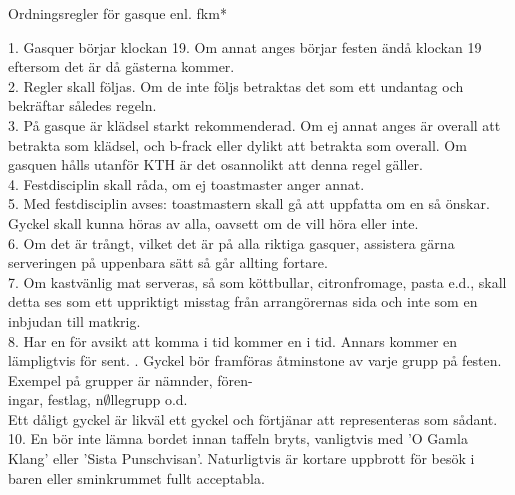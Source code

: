 \documentclass[a6paper, 10pt, twoside]{article}
\begin{document}
\begin{center} %
    \large Ordningsregler för gasque enl. fkm* %
\end{center}
\small
1. Gasquer börjar klockan 19. Om annat anges börjar festen ändå klockan 19 eftersom det är då gästerna kommer.
\vspace{5pt} \\
2. Regler skall följas. Om de inte följs betraktas det som ett undantag och bekräftar således regeln.
\vspace{5pt} \\
3. På gasque är klädsel starkt rekommenderad. Om ej annat anges är overall att betrakta som klädsel, och b-frack eller dylikt att betrakta som overall. Om gasquen hålls utanför KTH är det osannolikt att denna regel gäller.
\vspace{5pt} \\
4. Festdisciplin skall råda, om ej toastmaster anger annat.
\vspace{5pt} \\
5. Med festdisciplin avses: toastmastern skall gå att uppfatta om en så önskar. Gyckel skall kunna höras av alla, oavsett om de vill höra eller inte.
\vspace{5pt} \\
6. Om det är trångt, vilket det är på alla riktiga gasquer, assistera gärna serveringen på uppenbara sätt så går allting fortare.
\vspace{5pt} \\
7. Om kastvänlig mat serveras, så som köttbullar, citronfromage, pasta e.d., skall detta ses som ett uppriktigt misstag från arrangörernas sida och inte som en inbjudan till matkrig.
\vspace{5pt} \\
8. Har en för avsikt att komma i tid kommer en i tid. Annars kommer en lämpligtvis för sent.
. Gyckel bör framföras åtminstone av varje grupp på festen. Exempel på grupper är nämnder, fören-\\ingar, festlag, n$\emptyset$llegrupp o.d. \\Ett dåligt gyckel är likväl ett gyckel och förtjänar att representeras som sådant.
\vspace{5pt} \\
10. En bör inte lämna bordet innan taffeln bryts, vanligtvis med 'O Gamla Klang' eller 'Sista Punschvisan'. Naturligtvis är kortare uppbrott för besök i baren eller sminkrummet fullt acceptabla.
\end{document}
